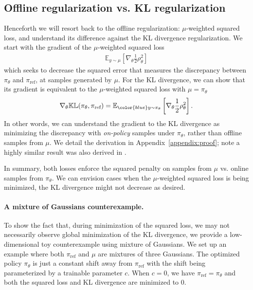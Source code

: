 \subsection{Offline regularization vs. KL regularization}

Henceforth we will resort back to the offline regularization: $\mu$-weighted squared loss, and understand its difference against the KL divergence regularization. We start with the gradient of the $\mu$-weighted squared loss 
\begin{align*}
    \mathbb{E}_{y\sim \mu}\left[\nabla_\theta\frac{1}{2}\rho_\theta^2\right]
\end{align*}
which seeks to decrease the squared error that measures the discrepancy between $\pi_\theta$ and $\pi_\text{ref}$, at samples generated by $\mu$. For the KL divergence, we can show that its gradient is equivalent to the $\mu$-weighted squared loss with  $\mu=\pi_\theta$
\begin{align}
\nabla_\theta \mathbb{KL}(\pi_\theta,\pi_\text{ref})= \mathbb{E}_{\color{blue}y\sim \pi_\theta}\left[\nabla_\theta \frac{1}{2}\rho_\theta^2\right].\label{eq:kl-mu}
\end{align}
In other words, we can understand the gradient to the KL divergence as minimizing the discrepancy with \emph{on-policy} samples under $\pi_\theta$, rather than offline samples from $\mu$. We detail the derivation in Appendix~\ref{appendix:proof}; note a highly similar result was also derived in \citep{richter2020vargrad}.

In summary, both losses enforce the squared penalty on samples from $\mu$ vs. online samples from $\pi_\theta$. We can envision cases when the $\mu$-weighted squared loss is being minimized, the KL divergence might not decrease as desired.

\paragraph{A mixture of Gaussians counterexample.} To show the fact that, during minimization of the squared loss, we may not necessarily observe global minimization of the KL divergence, we provide a low-dimensional toy counterexample using mixture of Gaussians. We set up an example where both $\pi_\text{ref}$ and $\mu$ are mixtures of three Gaussians. The optimized policy $\pi_\theta$ is just a constant shift away from $\pi_\text{ref}$ with the shift being parameterized by a trainable parameter $c$. When $c=0$, we have $\pi_\text{ref}=\pi_\theta$ and both the squared loss and KL divergence are minimized to $0$. 

